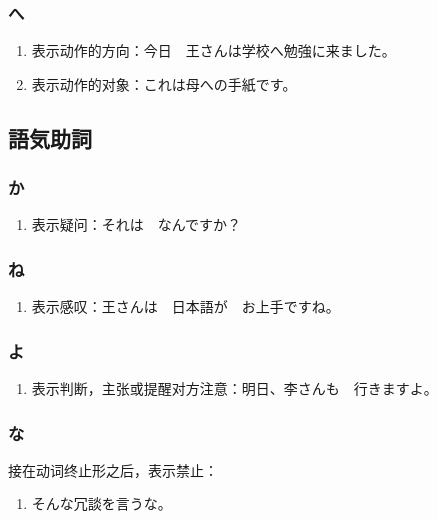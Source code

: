 \subsubsection{へ}%

\begin{enumerate}
  \item 表示动作的方向：今日　王さんは学校へ勉強に来ました。
  \item 表示动作的对象：これは母への手紙です。
\end{enumerate}



\subsection{語気助詞}%

\subsubsection{か}%

\begin{enumerate}
  \item 表示疑问：それは　なんですか？
\end{enumerate}


\subsubsection{ね}%

\begin{enumerate}
  \item 表示感叹：王さんは　日本語が　お上手ですね。
\end{enumerate}


\subsubsection{よ}%

\begin{enumerate}
  \item 表示判断，主张或提醒对方注意：明日、李さんも　行きますよ。
\end{enumerate}


\subsubsection{な}%

接在动词终止形之后，表示禁止：
\begin{enumerate}
  \item そんな冗談を言うな。
\end{enumerate}


